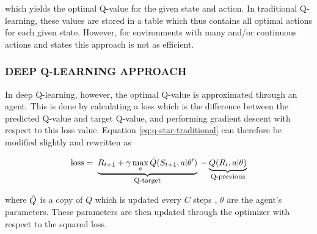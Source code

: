 \documentclass{article}
\let\oldcite\cite
\renewcommand{\cite}[1]{\textbf{\oldcite{#1}}}
\renewenvironment{leftbar}[1][\hsize]{
    \def\FrameCommand{{\color{barcolor}\vrule width 0.5pt \hspace{10pt}}}
    \MakeFramed{\hsize#1 \advance\hsize-\width \FrameRestore}
}{\endMakeFramed}
\newcommand{\explain}[2]{\underbrace{#1}_{\parbox{\widthof{\ensuremath{#1}}}{\footnotesize\centering #2}}}
\begin{document}
\begin{leftbar}
    which yields the optimal Q-value for the given state and action. \cite{Q-intro} In traditional Q-learning, these values are stored in a table which thus contains all optimal actions for each given state. However, for environments with many and/or continuous actions and states this approach is not as efficient.

    \subsubsection*{\hfill DEEP Q-LEARNING APPROACH}

    In deep Q-learning, however, the optimal Q-value is approximated through an agent. This is done by calculating a loss which is the difference between the predicted Q-value and target Q-value, and performing gradient descent with respect to this loss value. \cite{Q-deep} Equation \eqref{eq:q-star-traditional} can therefore be modified slightly and rewritten as

    \begin{equation*}
        \text{loss} = \explain{R_{t+1} + \gamma \max_a \Hat{Q}(S_{t+1}, a | \theta')}{\text{Q-target}} - \explain{Q(R_t, a | \theta)}{\text{Q-previous}}
    \end{equation*}

    where $\Hat{Q}$ is a copy of $Q$ which is updated every $C$ steps \cite{Human-level}, $\theta$ are the agent's parameters. These parameters are then updated through the optimizer with respect to the squared loss. \cite{Q-deep}


\end{leftbar}
\end{document}
